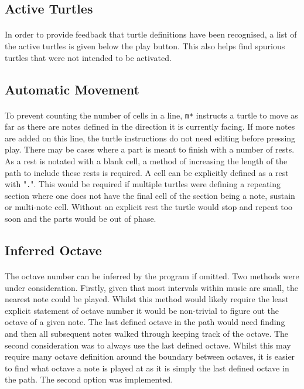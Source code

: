 \subsection{Active Turtles}

\paragraph{} In order to provide feedback that turtle definitions have been recognised, a list of the active turtles is given below the play button. This also helps find spurious turtles that were not intended to be activated.

\subsection{Automatic Movement}

\paragraph{} To prevent counting the number of cells in a line, \texttt{m*} instructs a turtle to move as far as there are notes defined in the direction it is currently facing. If more notes are added on this line, the turtle instructions do not need editing before pressing play. There may be cases where a part is meant to finish with a number of rests. As a rest is notated with a blank cell, a method of increasing the length of the path to include these rests is required. A cell can be explicitly defined as a rest with "\texttt{.}". This would be required if multiple turtles were defining a repeating section where one does not have the final cell of the section being a note, sustain or multi-note cell. Without an explicit rest the turtle would stop and repeat too soon and the parts would be out of phase.

\subsection{Inferred Octave}

\paragraph{} The octave number can be inferred by the program if omitted. Two methods were under consideration. Firstly, given that most intervals within music are small, the nearest note could be played.
Whilst this method would likely require the least explicit statement of octave number it would be non-trivial to figure out the octave of a given note. The last defined octave in the path would need finding and then all subsequent notes walked through keeping track of the octave. The second consideration was to always use the last defined octave. Whilst this may require many octave definition around the boundary between octaves, it is easier to find what octave a note is played at as it is simply the last defined octave in the path. The second option was implemented.

